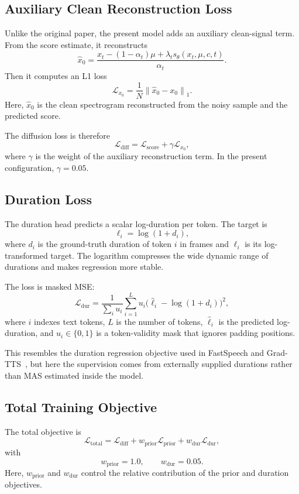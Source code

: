 \documentclass[11pt,a4paper]{article}
\begin{document}
\subsection{Auxiliary Clean Reconstruction Loss}

Unlike the original paper, the present model adds an auxiliary clean-signal term. From the score estimate, it reconstructs
\[
\hat{x}_0
=
\frac{x_t - (1-\alpha_t)\mu + \lambda_t s_{\theta}(x_t,\mu,c,t)}{\alpha_t}.
\]
Then it computes an L1 loss
\[
\mathcal{L}_{x_0}
=
\frac{1}{N}\left\|\hat{x}_0 - x_0\right\|_1.
\]
Here, $\hat{x}_0$ is the clean spectrogram reconstructed from the noisy sample and the predicted score.

The diffusion loss is therefore
\[
\mathcal{L}_{\text{diff}}
=
\mathcal{L}_{\text{score}} + \gamma \mathcal{L}_{x_0},
\]
where $\gamma$ is the weight of the auxiliary reconstruction term. In the present configuration, $\gamma=0.05$.

\subsection{Duration Loss}

The duration head predicts a scalar log-duration per token. The target is
\[
\ell_i = \log(1 + d_i),
\]
where $d_i$ is the ground-truth duration of token $i$ in frames and $\ell_i$ is its log-transformed target. The logarithm compresses the wide dynamic range of durations and makes regression more stable.

The loss is masked MSE:
\[
\mathcal{L}_{\text{dur}}
=
\frac{1}{\sum_i u_i}
\sum_{i=1}^{L} u_i \big(\hat{\ell}_i - \log(1+d_i)\big)^2,
\]
where $i$ indexes text tokens, $L$ is the number of tokens, $\hat{\ell}_i$ is the predicted log-duration, and $u_i \in \{0,1\}$ is a token-validity mask that ignores padding positions.

This resembles the duration regression objective used in FastSpeech and Grad-TTS~\cite{ren2019fastspeech,popov2021gradtts}, but here the supervision comes from externally supplied durations rather than MAS estimated inside the model.

\subsection{Total Training Objective}

The total objective is
\[
\mathcal{L}_{\text{total}}
=
\mathcal{L}_{\text{diff}}
+
w_{\text{prior}}\mathcal{L}_{\text{prior}}
+
w_{\text{dur}}\mathcal{L}_{\text{dur}},
\]
with
\[
w_{\text{prior}} = 1.0,
\qquad
w_{\text{dur}} = 0.05.
\]
Here, $w_{\text{prior}}$ and $w_{\text{dur}}$ control the relative contribution of the prior and duration objectives.
\end{document}

